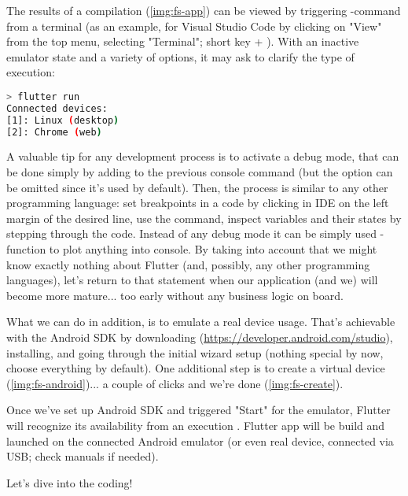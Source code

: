 \noindent The results of a compilation (\cref{img:fs-app}) can be viewed by triggering -command from a 
terminal (as an example, for Visual Studio Code by clicking on "View" from the top menu, selecting "Terminal"; short 
key  + ). With an inactive emulator state and a variety of options, it may ask to clarify 
the type of execution:

\begin{lstlisting}[language=bash]
> flutter run
Connected devices:
[1]: Linux (desktop)
[2]: Chrome (web)
\end{lstlisting}


\noindent A valuable tip for any development process is to activate a debug mode, that can be done simply by adding 
 to the previous console command (but the option can be omitted since it's used by default). Then, 
the process is similar to any other programming language: set breakpoints in a code by clicking in IDE on the left 
margin of the desired line, use the command, inspect variables and their states by stepping through the code. Instead 
of any debug mode it can be simply used -function to plot anything into console. By taking into account that 
we might know exactly nothing about Flutter (and, possibly, any other programming languages), let's return to that 
statement when our application (and we) will become more mature... too early without any business logic on board.

What we can do in addition, is to emulate a real device usage. That's achievable with the Android SDK by downloading 
(\href{https://developer.android.com/studio}{https://developer.android.com/studio}), installing, and going through 
the initial wizard setup (nothing special by now, choose everything by default). One additional step is to create a 
virtual device (\cref{img:fs-android})... a couple of clicks and we're done (\cref{img:fs-create}).

Once we've set up Android SDK and triggered "Start" for the emulator, Flutter will recognize its availability from
an execution . Flutter app will be build and launched on the connected Android emulator (or even real 
device, connected via USB; check manuals if needed).\\


\noindent Let's dive into the coding!
